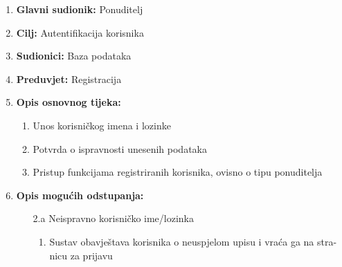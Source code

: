 \noindent {}
\begin{enumerate}
	
	\item \textbf{Glavni sudionik: } Ponuditelj
	\item  \textbf{Cilj:} Autentifikacija korisnika
	\item  \textbf{Sudionici:} Baza podataka
	\item  \textbf{Preduvjet:} Registracija
	\item  \textbf{Opis osnovnog tijeka:}
	
	\begin{enumerate}
		
		\item Unos korisničkog imena i lozinke
		\item Potvrda o ispravnosti unesenih podataka
		\item Pristup funkcijama registriranih korisnika, ovisno o tipu ponuditelja
		
	\end{enumerate}
	
	\item  \textbf{Opis mogućih odstupanja:}
	
	\item[] \begin{enumerate}
		
		\item[2.a] Neispravno korisničko ime/lozinka
		\item[] \begin{enumerate}
			
			\item Sustav obavještava korisnika o neuspjelom upisu i vraća ga na stra-
			nicu za prijavu
			
		\end{enumerate}
		
	\end{enumerate}
	
\end{enumerate}

